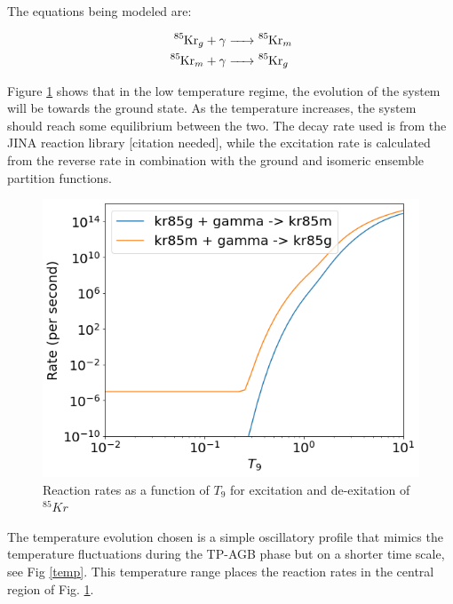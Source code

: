\documentclass{article}
\begin{document}
The equations being modeled are:

\begin{align*}
    \ce{^85Kr_g + \gamma &-> ^85Kr_m}\\
    \ce{^85Kr_m + \gamma &-> ^85Kr_g}
\end{align*}

Figure \ref{rates} shows that in the low temperature regime, the evolution of the system will be towards the ground state. As the 
temperature increases, the system should reach some equilibrium between the two. The decay rate used is from the JINA reaction 
library [citation needed], while the excitation rate is calculated from the reverse rate in combination with the ground and 
isomeric ensemble partition functions.


\begin{figure}[H]
    \centerline{\includegraphics[scale = 0.5]{images/iso_rates.png}}
    \caption{Reaction rates as a function of $T_{9}$ for excitation and de-exitation of $^{85}Kr$}
    \label{rates}
\end{figure}

The temperature evolution chosen is a simple oscillatory profile that mimics the temperature fluctuations during the TP-AGB phase but 
on a shorter time scale, see Fig \ref{temp}. This temperature range places the reaction rates in the central region of Fig. \ref{rates}.
\end{document}
